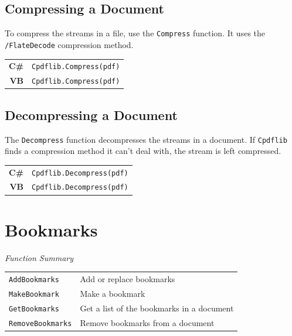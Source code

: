 \documentclass[a4paper]{memoir}
\begin{document}
\section{Compressing a Document}
To compress the streams in a file, use the \verb!Compress! function. It uses the \verb!/FlateDecode! compression method.

\begin{framed}
\noindent\begin{tabular}{rl}
\small\sffamily\textbf{C\#} &
\begin{minipage}{4in}
\small\verb!Cpdflib.Compress(pdf)!
\end{minipage}\\[5mm]
\small\sffamily\textbf{VB} &
\begin{minipage}{4in}
\small\verb!Cpdflib.Compress(pdf)!
\end{minipage}\\[5mm]
\end{tabular}
\end{framed}

\section{Decompressing a Document}
The \verb!Decompress! function decompresses the streams in a document. If \verb!Cpdflib! finds a compression method it can't deal with, the stream is left compressed.
\begin{framed}
\noindent\begin{tabular}{rl}
\small\sffamily\textbf{C\#} &
\begin{minipage}{4in}
\small\verb!Cpdflib.Decompress(pdf)!
\end{minipage}\\[5mm]
\small\sffamily\textbf{VB} &
\begin{minipage}{4in}
\small\verb!Cpdflib.Decompress(pdf)!
\end{minipage}\\[5mm]
\end{tabular}
\end{framed}

\chapter{Bookmarks}
\begin{framed}
\noindent\textit{Function Summary}\\[2mm]
\noindent\begin{tabular}{ll}
\verb!AddBookmarks! & Add or replace bookmarks\\
\verb!MakeBookmark! & Make a bookmark\\
\verb!GetBookmarks! & Get a list of the bookmarks in a document\\
\verb!RemoveBookmarks! & Remove bookmarks from a document
\end{tabular}
\end{framed}
\end{document}
